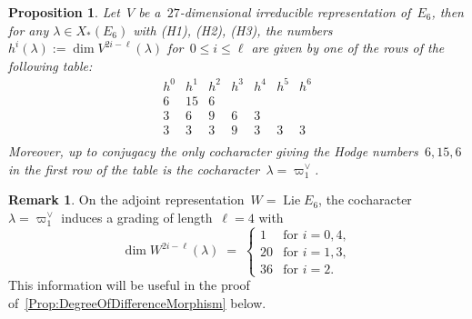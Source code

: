 \documentclass[a4paper]{amsart}
\DeclareMathOperator{\Lie}{Lie}
\renewcommand{\le}{\leqslant}
\theoremstyle{plain}
\newtheorem{proposition}[theorem]{Proposition}
\theoremstyle{definition}
\newtheorem{remark}[theorem]{Remark}
\numberwithin{equation}{section}
\begin{document}
\begin{proposition}  \label{prop:E6}
Let~$V$ be a~$27$-dimensional irreducible representation of~$E_6$, then for any
%
$
 \lambda \in X_\ast(E_6)
$
%
with (H1), (H2), (H3), the numbers
%
$h^i(\lambda) := \dim V^{2i-\ell}(\lambda)$ for~$0\le i\le \ell$
%
are given by one of the rows of the following table: 
%
\[
\begin{array}{c|c|c|c|c|c|c}
h^0 & h^1 & h^2 & h^3 & h^4 & h^5 & h^6  \\
\hline
6 & 15 & 6 &&&&\\
3 & 6 & 9 & 6 & 3 && \\
3 & 3 & 3 & 9 & 3 & 3 & 3  \\
\end{array}
\]
%
Moreover, up to conjugacy the only cocharacter giving the Hodge numbers~$6,15,6$ in the first row of the table is the cocharacter~$\lambda = \varpi_1^\vee$.
\end{proposition}

\begin{remark} \label{rem:adjoint-hodge-numbers}
On the adjoint representation~$W=\Lie E_6$, the cocharacter~$\lambda=\varpi_1^\vee$ induces a grading of length~$\ell = 4$ with 
%
\[
 \dim W^{2i-\ell}(\lambda) \;=\; 
 \begin{cases} 
 1 & \text{for~$i=0,4$}, \\ 20 & \text{for~$i=1,3$}, \\ 36 & \text{for~$i=2$}.
 \end{cases} 
\]
%
This information will be useful in the proof of~\cref{Prop:DegreeOfDifferenceMorphism} below.
\end{remark} 
\end{document}
